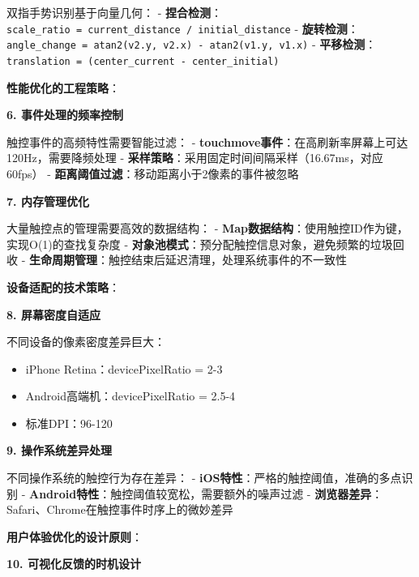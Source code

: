 双指手势识别基于向量几何： - \textbf{捏合检测}：\texttt{scale\_ratio\ =\ current\_distance\ /\ initial\_distance} - \textbf{旋转检测}：\texttt{angle\_change\ =\ atan2(v2.y,\ v2.x)\ -\ atan2(v1.y,\ v1.x)} - \textbf{平移检测}：\texttt{translation\ =\ (center\_current\ -\ center\_initial)}

\textbf{性能优化的工程策略}：

\textbf{6. 事件处理的频率控制}

触控事件的高频特性需要智能过滤： - \textbf{touchmove事件}：在高刷新率屏幕上可达120Hz，需要降频处理 - \textbf{采样策略}：采用固定时间间隔采样（16.67ms，对应60fps） - \textbf{距离阈值过滤}：移动距离小于2像素的事件被忽略

\textbf{7. 内存管理优化}

大量触控点的管理需要高效的数据结构： - \textbf{Map数据结构}：使用触控ID作为键，实现O(1)的查找复杂度 - \textbf{对象池模式}：预分配触控信息对象，避免频繁的垃圾回收 - \textbf{生命周期管理}：触控结束后延迟清理，处理系统事件的不一致性

\textbf{设备适配的技术策略}：

\textbf{8. 屏幕密度自适应}

不同设备的像素密度差异巨大：

\begin{Shaded}
\begin{Highlighting}[]
\OperatorTok{=}\OperatorTok{*}\OperatorTok{/}\OperatorTok{*}
\end{Highlighting}
\end{Shaded}

\begin{itemize}
\tightlist
\item
  iPhone Retina：devicePixelRatio = 2-3
\item
  Android高端机：devicePixelRatio = 2.5-4
\item
  标准DPI：96-120
\end{itemize}

\textbf{9. 操作系统差异处理}

不同操作系统的触控行为存在差异： - \textbf{iOS特性}：严格的触控阈值，准确的多点识别 - \textbf{Android特性}：触控阈值较宽松，需要额外的噪声过滤 - \textbf{浏览器差异}：Safari、Chrome在触控事件时序上的微妙差异

\textbf{用户体验优化的设计原则}：

\textbf{10. 可视化反馈的时机设计}

